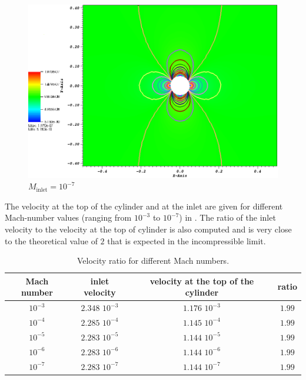         \begin{figure}[H]
                \centering
                \includegraphics[width=\textwidth]{figures/CylinderMach1em7ZoomIn.png}
                \caption{$M_{\text{inlet}}=10^{-7}$}
                \label{fig:cyl_1em7}
        \end{figure}
%
The velocity at the top of the cylinder and at the inlet are given for different Mach-number values (ranging from $10^{-3}$ to $10^{-7}$) in . The ratio of the inlet velocity to the velocity at the top of cylinder is also computed and is very close to the theoretical value of $2$ that is expected in the incompressible limit.
%
\begin{table}[H]
\begin{center}
 \caption{\label{tbl:velocity_ratio}Velocity ratio for different Mach numbers.}
\begin{tabular}{|c|c|c|c|}
\hline
Mach number & inlet velocity & velocity at the top of the cylinder & ratio \\ \hline
$10^{-3}$ & $2.348$ $10^{-3}$ & $1.176$ $10^{-3}$& $1.99$  \\ \hline
$10^{-4}$ & $2.285$ $10^{-4}$ & $1.145$ $10^{-4}$& $1.99$  \\ \hline
$10^{-5}$ & $2.283$ $10^{-5}$ & $1.144$ $10^{-5}$ & $1.99$ \\ \hline
$10^{-6}$ & $2.283$ $10^{-6}$ & $1.144$ $10^{-6}$ & $1.99$ \\ \hline
$10^{-7}$ & $2.283$ $10^{-7}$ & $1.144$ $10^{-7}$ & $1.99$ \\ \hline
\end{tabular}
\end{center}
\nonumber
\end{table}

